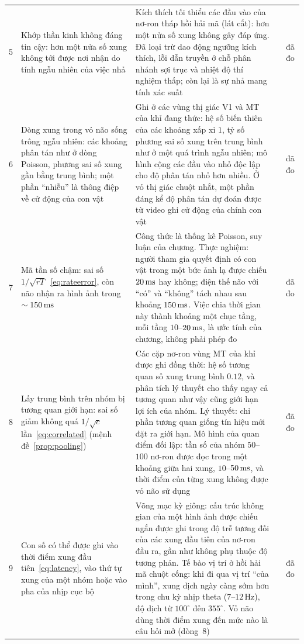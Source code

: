 {\begin{longtable}{>{\raggedright}p{0.5cm}>{\raggedright}p{4.0cm}>{\raggedright}p{5.6cm}>{\raggedright}p{2.3cm}>{\raggedright\arraybackslash}p{1.7cm}}
5 & Khớp thần kinh không đáng tin cậy: hơn một nửa số xung không tới được nơi nhận do tính ngẫu nhiên của việc nhả & Kích thích tối thiểu các đầu vào của nơ-ron tháp hồi hải mã (lát cắt): hơn một nửa số xung không gây đáp ứng. Đã loại trừ dao động ngưỡng kích thích, lỗi dẫn truyền ở chỗ phân nhánh sợi trục và nhiệt độ thí nghiệm thấp; còn lại là sự nhả mang tính xác suất & \cite{AllenStevens1994} & đã đo \\
6 & Dòng xung trong vỏ não sống trông ngẫu nhiên: các khoảng phân tán như ở dòng Poisson, phương sai số xung gần bằng trung bình; một phần ``nhiễu'' là thông điệp về cử động của con vật & Ghi ở các vùng thị giác V1 và MT của khỉ đang thức: hệ số biến thiên của các khoảng xấp xỉ $1$, tỷ số phương sai số xung trên trung bình như ở một quá trình ngẫu nhiên; mô hình cộng các đầu vào nhỏ độc lập cho độ phân tán nhỏ hơn nhiều. Ở vỏ thị giác chuột nhắt, một phần đáng kể độ phân tán dự đoán được từ video ghi cử động của chính con vật & \cite{Softky1993,Stringer2019} & đã đo \\
7 & Mã tần số chậm: sai số $1/\sqrt{rT}$~\eqref{eq:rateerror}, còn não nhận ra hình ảnh trong $\sim150\,\text{ms}$ & Công thức là thống kê Poisson, suy luận của chương. Thực nghiệm: người tham gia quyết định có con vật trong một bức ảnh lạ được chiếu $20\,\text{ms}$ hay không; điện thế não với ``có'' và ``không'' tách nhau sau khoảng $150\,\text{ms}$. Việc chia thời gian này thành khoảng một chục tầng, mỗi tầng $10$--$20\,\text{ms}$, là ước tính của chương, không phải phép đo & \cite{Thorpe1996} & đã đo \\
8 & Lấy trung bình trên nhóm bị tương quan giới hạn: sai số giảm không quá $1/\sqrt c$ lần~\eqref{eq:correlated} (mệnh đề~\ref{prop:pooling}) & Các cặp nơ-ron vùng MT của khỉ được ghi đồng thời: hệ số tương quan số xung trung bình $0.12$, và phân tích lý thuyết cho thấy ngay cả tương quan như vậy cũng giới hạn lợi ích của nhóm. Lý thuyết: chỉ phần tương quan giống tín hiệu mới đặt ra giới hạn. Mô hình của quan điểm đối lập: tần số của nhóm $50$--$100$ nơ-ron được đọc trong một khoảng giữa hai xung, $10$--$50\,\text{ms}$, và thời điểm của từng xung không được vỏ não sử dụng & \cite{Zohary1994,MorenoBote2014,ShadlenNewsome1998} & đã đo \\
9 & Con số có thể được ghi vào thời điểm xung đầu tiên~\eqref{eq:latency}, vào thứ tự xung của một nhóm hoặc vào pha của nhịp cục bộ & Võng mạc kỳ giông: cấu trúc không gian của một hình ảnh được chiếu ngắn được ghi trong độ trễ tương đối của các xung đầu tiên của nơ-ron đầu ra, gần như không phụ thuộc độ tương phản. Tế bào vị trí ở hồi hải mã chuột cống: khi đi qua vị trí ``của mình'', xung dịch ngày càng sớm hơn trong chu kỳ nhịp theta ($7$--$12$\,Hz), độ dịch từ $100^\circ$ đến $355^\circ$. Vỏ não dùng thời điểm xung đến mức nào là câu hỏi mở (dòng~8) & \cite{Gollisch2008,OKeefe1993} & đã đo \\

\end{longtable}}
